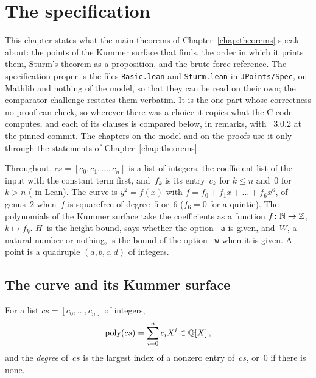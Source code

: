 \chapter{The specification}\label{chap:spec}

This chapter states what the main theorems of Chapter~\ref{chap:theorems} speak about: the points
of the Kummer surface that \jpoints{} finds, the order in which it prints them, Sturm's theorem as a
proposition, and the brute-force reference. The specification proper is the files
\verb|Basic.lean| and \verb|Sturm.lean| in \verb|JPoints/Spec|, on Mathlib and nothing of the
model, so that they can be read on their own; the comparator challenge restates them verbatim. It
is the one part whose correctness no proof can check, so wherever there was a choice it copies what
the C code computes, and each of its clauses is compared below, in remarks, with \jpoints{}~3.0.2
at the pinned commit. The chapters on the model and on the proofs use it only through the
statements of Chapter~\ref{chap:theorems}.

Throughout, $cs = [c_0, c_1, \dots, c_n]$ is a list of integers, the coefficient list of the input
with the constant term first, and~$f_k$ is its entry~$c_k$ for $k \le n$ and~$0$ for $k > n$
( in Lean). The curve is $y^2 = f(x)$ with
$f = f_0 + f_1 x + \dots + f_6 x^6$, of genus~$2$ when~$f$ is squarefree of degree~$5$ or~$6$
($f_6 = 0$ for a quintic). The polynomials of the Kummer surface take the coefficients as a
function $f \colon \mathbb{N} \to \mathbb{Z}$, $k \mapsto f_k$. $H$~is the height bound,  says whether
the option \texttt{-a} is given, and~$W$, a natural number or nothing, is the bound of the option
\texttt{-w} when it is given. A point is a quadruple $(a, b, c, d)$ of integers.

\section{The curve and its Kummer surface}\label{sec:specCurve}

\begin{definition}\label{def:poly}
  \leanok
  For a list $cs = [c_0, \dots, c_n]$ of integers,
  \[ \mathrm{poly}(cs) = \sum_{i=0}^{n} c_i X^i \in \mathbb{Q}[X]\,, \]
  and the \emph{degree} of~$cs$ is the largest index of a nonzero entry of~$cs$, or~$0$ if there
  is none.
\end{definition}

